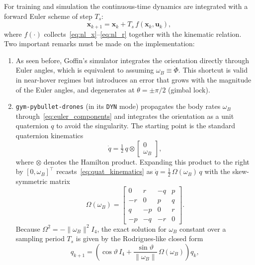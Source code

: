 \documentclass[11pt,a4paper]{article}
\theoremstyle{remark}
\numberwithin{equation}{section}
\begin{document}
For training and simulation the continuous-time dynamics are integrated with a forward
Euler scheme of step $T_s$:
\begin{equation}
\mathbf{x}_{k+1} = \mathbf{x}_k + T_s\, f(\mathbf{x}_k, \mathbf{u}_k),
\label{eq:euler_discretization}
\end{equation}
where $f(\cdot)$ collects~\eqref{eq:nl_x}--\eqref{eq:nl_r} together with the kinematic
relation. Two important remarks must be made on the implementation:
\begin{enumerate}
    \item As seen before, Goffin's simulator integrates the orientation directly through Euler angles, which
    is equivalent to assuming $\omega_B \equiv \dot{\Phi}$. This shortcut is valid in
    near-hover regimes but introduces an error that grows with the magnitude of the
    Euler angles, and degenerates at $\theta = \pm\pi/2$ (gimbal lock).
    \item \texttt{gym-pybullet-drones} (in its \texttt{DYN} mode) propagates the body rates
    $\omega_B$ through~\eqref{eq:euler_components} and integrates the orientation as a unit
    quaternion $q$ to avoid the singularity. The starting point is the standard
    quaternion kinematics
    \begin{equation}
    \dot{q} = \tfrac{1}{2}\, q \otimes \begin{bmatrix} 0 \\ \omega_B \end{bmatrix},
    \label{eq:quat_kinematics}
    \end{equation}
    where $\otimes$ denotes the Hamilton product. Expanding this product to the right by
    $[0, \omega_B]^\top$ recasts~\eqref{eq:quat_kinematics} as
    $\dot q = \tfrac{1}{2}\, \Omega(\omega_B)\, q$ with the skew-symmetric matrix
    \begin{equation}
    \Omega(\omega_B) = \begin{bmatrix}
    0  &  r & -q &  p \\
    -r &  0 &  p &  q \\
    q  & -p &  0 &  r \\
    -p & -q & -r &  0
    \end{bmatrix}.
    \label{eq:Omega}
    \end{equation}
    Because $\Omega^2 = -\|\omega_B\|^2 I_4$, the exact solution for $\omega_B$ constant
    over a sampling period $T_s$ is given by the Rodrigues-like closed form
    \begin{equation}
    q_{k+1} = \left( \cos\vartheta \, I_4 + \frac{\sin\vartheta}{\|\omega_B\|}\, \Omega(\omega_B) \right) q_k,

\end{equation}
\end{enumerate}
\end{document}
